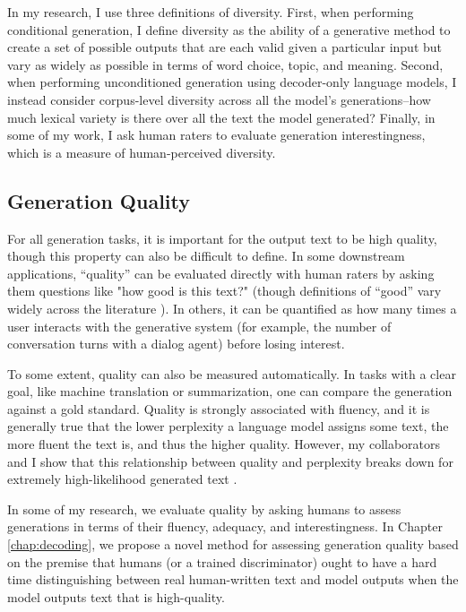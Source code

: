 \begin{itemize}
In my research, I use three definitions of diversity.
First, when performing conditional generation, I define diversity as the ability of a generative method to create a set of possible outputs that are each valid given a particular input but vary as widely as possible in terms of word choice, topic, and meaning.
Second, when performing unconditioned generation using decoder-only language models, I instead consider corpus-level diversity across all the model's generations--how much lexical variety is there over all the text the model generated?
Finally, in some of my work, I ask human raters to evaluate generation interestingness, which is a measure of human-perceived diversity.


\subsection{Generation Quality}
For all generation tasks, it is important for the output text to be high quality, though this property can also be difficult to define.
In some downstream applications, ``quality'' can be evaluated directly with human raters by asking them questions like "how good is this text?" (though definitions of ``good'' vary widely across the literature \citep{van2019best}).
In others, it can be quantified as how many times a user interacts with the generative system (for example, the number of conversation turns with a dialog agent) before losing interest.

To some extent, quality can also be measured automatically.
In tasks with a clear goal, like machine translation or summarization, one can compare the generation against a gold standard.
Quality is strongly associated with fluency, and it is generally true that the lower perplexity a language model assigns some text, the more fluent the text is, and thus the higher quality.
However, my collaborators and I show that this relationship between quality and perplexity breaks down for extremely high-likelihood generated text \citep{zhang2021trading}.

In some of my research, we evaluate quality by asking humans to assess generations in terms of their fluency, adequacy, and interestingness.
In Chapter \ref{chap:decoding}, we propose a novel method for assessing generation quality based on the premise that humans (or a trained discriminator) ought to have a hard time distinguishing between real human-written text and model outputs when the model outputs text that is high-quality.


\end{itemize}

